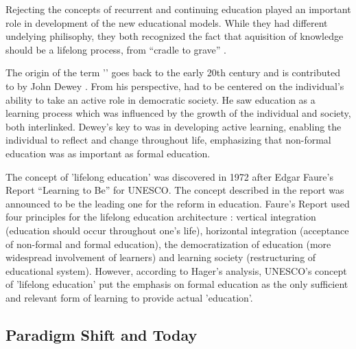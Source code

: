 Rejecting the concepts of recurrent and continuing education played an important
role in development of the new educational models. While they had different
undelying  philisophy, they both recognized the fact that aquisition of
knowledge should be a lifelong process, from ``cradle to grave''
\citep{Hargreaves2004}.

The origin of the term '\LLLsn' goes back to the early 20th century and is
contributed to by John Dewey \citeyearpar{Dewey2004}. From his perspective,
\LLLs had to be centered on the individual's ability to take an active role in
democratic society. He saw education as a learning process which was influenced
by the growth of the individual and society, both interlinked. Dewey's key to
\LLLs was in developing active learning, enabling the individual to reflect and
change throughout life, emphasizing that non-formal education was as important
as formal education.

The concept of 'lifelong education' was discovered in 1972 after Edgar Faure's
Report ``Learning to Be'' for UNESCO. The concept described in the report was
announced to be the leading one for the reform in education. Faure's Report used
four principles for the lifelong education architecture \citep{Faure1972}:
vertical integration (education should occur throughout one's life), horizontal
integration (acceptance of non-formal and formal education), the democratization
of education (more widespread involvement of learners) and learning society
(restructuring of educational system). However, according to Hager's
\citeyearpar{Hager2011} analysis, UNESCO's concept of 'lifelong education' put
the emphasis on formal education as the only sufficient and relevant form of
learning to provide actual 'education'.

\subsection{Paradigm Shift and \LLLc Today}

